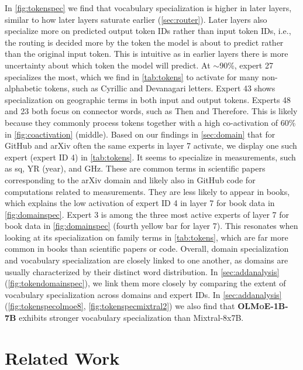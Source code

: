 \documentclass{article}
\newcommand{\modelsmall}{\textbf{\textsc{OLMoE-1B-7B}}}
\begin{document}
In \autoref{fig:tokenspec} we find that vocabulary specialization is higher in later layers, similar to how later layers saturate earlier (\autoref{sec:router}). Later layers also specialize more on predicted output token IDs rather than input token IDs, i.e., the routing is decided more by the token the model is about to predict rather than the original input token. This is intuitive as in earlier layers there is more uncertainty about which token the model will predict. At $\sim$90\%, expert 27 specializes the most, which we find in \autoref{tab:tokens} to activate for many non-alphabetic tokens, such as Cyrillic and Devanagari letters. Expert 43 shows specialization on geographic terms in both input and output tokens. Experts 48 and 23 both focus on connector words, such as \colorbox{lightOlmoeLightBlue}{ Then} and \colorbox{lightOlmoeLightBlue}{ Therefore}. This is likely because they commonly process tokens together with a high co-activation of 60\% in \autoref{fig:coactivation} (middle). Based on our findings in \autoref{sec:domain} that for GitHub and arXiv often the same experts in layer 7 activate, we display one such expert (expert ID 4) in \autoref{tab:tokens}. It seems to specialize in measurements, such as \colorbox{lightOlmoeLightBlue}{ sq}, \colorbox{lightOlmoeLightBlue}{YR} (year), and \colorbox{lightOlmoeLightBlue}{ GHz}. These are common terms in scientific papers corresponding to the arXiv domain and likely also in GitHub code for computations related to measurements. They are less likely to appear in books, which explains the low activation of expert ID 4 in layer 7 for book data in \autoref{fig:domainspec}. Expert 3 is among the three most active experts of layer 7 for book data in \autoref{fig:domainspec} (fourth yellow bar for layer 7). This resonates when looking at its specialization on family terms in \autoref{tab:tokens}, which are far more common in books than scientific papers or code. Overall, domain specialization and vocabulary specialization are closely linked to one another, as domains are usually characterized by their distinct word distribution. In \autoref{sec:addanalysis} (\autoref{fig:tokendomainspec}), we link them more closely by comparing the extent of vocabulary specialization across domains and expert IDs. In \autoref{sec:addanalysis} (\autoref{fig:tokenspecolmoe8}, \autoref{fig:tokenspecmixtral2}) we also find that \modelsmall{} exhibits stronger vocabulary specialization than Mixtral-8x7B.

\section{Related Work}
\end{document}
